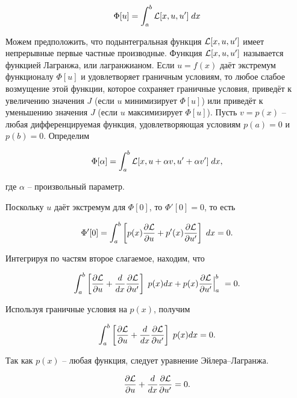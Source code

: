 \begin{displaymath}
	\Phi[u] = \int_{a}^{b} \mathcal{L}[x, u, u'] \; dx
\end{displaymath}

Можем предположить, что подынтегральная функция $\mathcal{L}[x, u, u']$ имеет непрерывные первые частные производные. Функция $\mathcal{L}[x, u, u']$ называется функцией Лагранжа, или лагранжианом. 
Если $u = f(x)$ даёт экстремум функционалу $\Phi[u]$ и удовлетворяет граничным условиям, то любое слабое возмущение этой функции, 
которое сохраняет граничные условия, приведёт к увеличению значения $J$ (если $u$ минимизирует $\Phi[u]$) или приведёт к уменьшению значения $J$ (если $u$ максимизирует $\Phi[u]$).
Пусть $v = p(x)$ -- любая дифференцируемая функция, удовлетворяющая условиям $p(a) = 0$ и $p(b) = 0$.
Определим

\begin{displaymath}
	\Phi[\alpha] = \int_{a}^{b} \mathcal{L}[x, u + \alpha v, u' +  \alpha v'] \; dx,
\end{displaymath}

\noindent где $\alpha$ -- произвольный параметр.

Поскольку $u$ даёт экстремум для $\Phi[0]$, то $\Phi'[0] = 0$, то есть

\begin{displaymath}
	\Phi'[0] = \int_{a}^{b} \left[ p(x) \frac{\partial \mathcal{L}}{\partial u} + p ' (x) \frac{\partial \mathcal{L}}{\partial u'} \right]  \; dx = 0.
\end{displaymath}

\noindent Интегрируя по частям второе слагаемое, находим, что 

\begin{displaymath}
	\int_{a}^{b} \left[\frac{\partial \mathcal{L}}{\partial u} + \frac{d}{dx} \frac{\partial \mathcal{L}}{\partial u'} \right]  \; p(x) dx + p(x) \frac{\partial \mathcal{L}}{\partial u'} \Big|_a^b \ = 0.
\end{displaymath}

\noindent Используя граничные условия на $p(x)$, получим

\begin{displaymath}
	\int_{a}^{b} \left[\frac{\partial \mathcal{L}}{\partial u} + \frac{d}{dx} \frac{\partial \mathcal{L}}{\partial u'} \right]  \; p(x) dx = 0.
\end{displaymath}

\noindent Так как $p(x)$ -- любая функция, следует уравнение Эйлера--Лагранжа.

\begin{equation}\label{euler_equation}
	\frac{\partial \mathcal{L}}{\partial u} + \frac{d}{dx} \frac{\partial \mathcal{L}}{\partial u'} = 0.
\end{equation}

